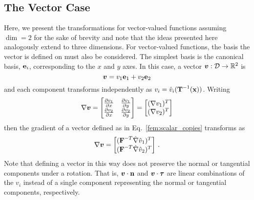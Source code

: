 \documentclass[../doc.tex]{subfiles}
\begin{document}
\subsection{The Vector Case}
Here, we present the transformations for vector-valued functions assuming $\dim = 2$ for the sake of brevity and note that the ideas presented here analogously extend to three dimensions. 
For vector-valued functions, the basis the vector is defined on must also be considered. The simplest basis is the canonical basis, $\boldsymbol{\mathrm{e}}_i$, corresponding to the $x$ and $y$ axes. In this case, a vector $\boldsymbol{v} : \mathcal{D} \rightarrow \mathbb{R}^2$ is 
	\begin{equation} \label{fem:scalar_copies}
		\boldsymbol{v} = v_1 \boldsymbol{\mathrm{e}}_1 + v_2 \boldsymbol{\mathrm{e}}_2 
	\end{equation}
and each component transforms independently as $v_i = \hat{v}_i(\boldsymbol{\mathrm{T}}^{-1}(\boldsymbol{\mathrm{x}}))$. Writing
	\begin{equation}
		\nabla\boldsymbol{v} = \begin{bmatrix} 
			\frac{\partial v_1}{\partial x} & \frac{\partial v_1}{\partial y} \\ 
			\frac{\partial v_2}{\partial x} & \frac{\partial v_2}{\partial y}
		\end{bmatrix} = \begin{bmatrix} 
			(\nabla v_1)^T \\ 
			(\nabla v_2)^T 
		\end{bmatrix}		
	\end{equation}
then the gradient of a vector defined as in Eq.~\ref{fem:scalar_copies} transforms as 
	\begin{equation} \label{fem:scalar_copies_grad}
		\nabla\boldsymbol{v} = \begin{bmatrix} 
			(\boldsymbol{\mathrm{F}}^{-T} \hat{\nabla}\hat{v}_1)^T \\
			(\boldsymbol{\mathrm{F}}^{-T}\hat{\nabla}\hat{v}_2)^T 
		\end{bmatrix} \,. 
	\end{equation}
Note that defining a vector in this way does not preserve the normal or tangential components under a rotation. That is, $\boldsymbol{v}\cdot\boldsymbol{\mathrm{n}}$ and $\boldsymbol{v}\cdot\boldsymbol{\mathrm{\tau}}$ are linear combinations of the $v_i$ instead of a single component representing the normal or tangential components, respectively. 
\end{document}
